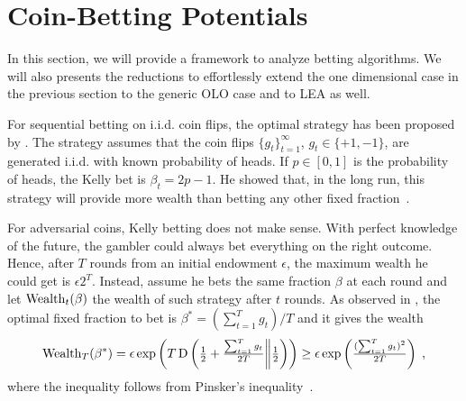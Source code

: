 \section{Coin-Betting Potentials}
\label{section:coin-betting-potentials}

In this section, we will provide a framework to analyze betting algorithms.  We
will also presents the reductions to effortlessly extend the one dimensional
case in the previous section to the generic \ac{OLO} case and to \ac{LEA} as
well.

For sequential betting on i.i.d. coin flips, the optimal strategy has been
proposed by \citet{Kelly-1956}.  The strategy assumes that the coin flips
$\{g_t\}_{t=1}^\infty$, $g_t \in \{+1,-1\}$, are generated i.i.d. with known
probability of heads. If $p \in [0,1]$ is the probability of heads, the Kelly
bet is $\beta_t = 2p - 1$. He showed that, in the long run, this strategy will
provide more wealth than betting any other fixed fraction~\cite{Kelly-1956}.

For adversarial coins, Kelly betting does not make sense. With perfect
knowledge of the future, the gambler could always bet everything on the right
outcome.  Hence, after $T$ rounds from an initial endowment $\epsilon$, the
maximum wealth he could get is $\epsilon 2^T$.  Instead, assume he bets the
same fraction $\beta$ at each round and let $\operatorname{Wealth}_t(\beta)$ the wealth of
such strategy after $t$ rounds. As observed in \cite{McMahan-Abernethy-2013},
the optimal fixed fraction to bet is $\beta^*=(\sum_{t=1}^T g_t)/T$ and it
gives the wealth
\begin{equation}
\label{eq:opt_wealth}
\operatorname{Wealth}_T(\beta^*)
= \epsilon \exp\left(T \operatorname{D}\left({\tfrac{1}{2}+\tfrac{\sum_{t=1}^T g_t}{2T}}\middle\|{\tfrac{1}{2}}\right)\right)
\geq \epsilon \exp\left(\tfrac{(\sum_{t=1}^T g_t)^2}{2 T}\right) \; ,
\end{equation}
where the inequality follows from Pinsker's inequality~\citep[Lemma
11.6.1]{Cover-Thomas-2006}.

